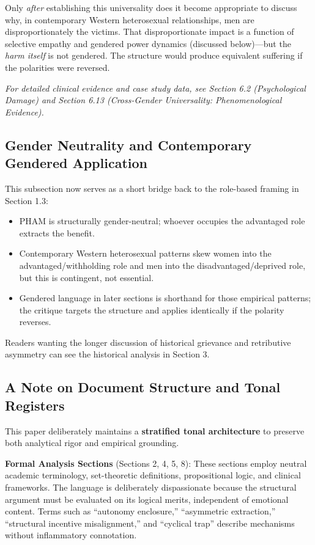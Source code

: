 \documentclass[12pt, letterpaper]{article}
\begin{document}
Only \textit{after} establishing this universality does it become appropriate to discuss why, in contemporary Western heterosexual relationships, men are disproportionately the victims. That disproportionate impact is a function of selective empathy and gendered power dynamics (discussed below)---but the \textit{harm itself} is not gendered. The structure would produce equivalent suffering if the polarities were reversed.

\textit{For detailed clinical evidence and case study data, see Section 6.2 (Psychological Damage) and Section 6.13 (Cross-Gender Universality: Phenomenological Evidence).}

\subsection{Gender Neutrality and Contemporary Gendered Application}
This subsection now serves as a short bridge back to the role-based framing in Section 1.3:
\begin{itemize}
    \item PHAM is structurally gender-neutral; whoever occupies the advantaged role extracts the benefit.
    \item Contemporary Western heterosexual patterns skew women into the advantaged/withholding role and men into the disadvantaged/deprived role, but this is contingent, not essential.
    \item Gendered language in later sections is shorthand for those empirical patterns; the critique targets the structure and applies identically if the polarity reverses.
\end{itemize}
Readers wanting the longer discussion of historical grievance and retributive asymmetry can see the historical analysis in Section 3.

\subsection{A Note on Document Structure and Tonal Registers}

This paper deliberately maintains a \textbf{stratified tonal architecture} to preserve both analytical rigor and empirical grounding.

\textbf{Formal Analysis Sections} (Sections 2, 4, 5, 8): These sections employ neutral academic terminology, set-theoretic definitions, propositional logic, and clinical frameworks. The language is deliberately dispassionate because the structural argument must be evaluated on its logical merits, independent of emotional content. Terms such as ``autonomy enclosure,'' ``asymmetric extraction,'' ``structural incentive misalignment,'' and ``cyclical trap'' describe mechanisms without inflammatory connotation.
\end{document}
